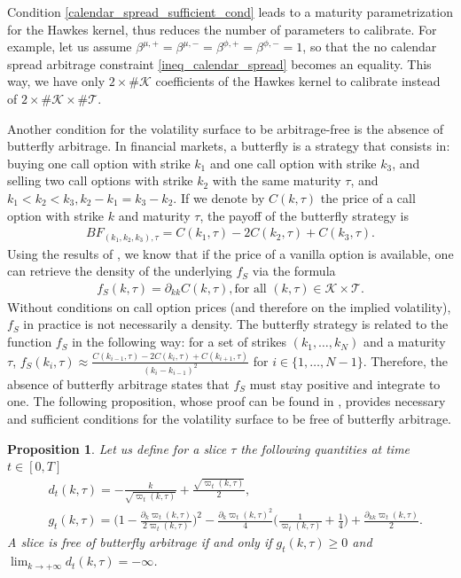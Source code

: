 \documentclass[12pt]{article}
\newtheorem{proposition}[theorem2]{Proposition}
\begin{document}
Condition \eqref{calendar_spread_sufficient_cond} leads to a maturity parametrization for the Hawkes kernel, thus reduces the number of parameters to calibrate. For example, let us assume $\beta^{\mu,+}=\beta^{\mu,-}=\beta^{\phi,+}=\beta^{\phi,-}=1$, so that the no calendar spread arbitrage constraint \eqref{ineq_calendar_spread} becomes an equality. This way, we have only $2\times \#\mathcal{K}$ coefficients of the Hawkes kernel to calibrate instead of $2\times \#\mathcal{K}\times\#\mathcal{T}$. \medskip

Another condition for the volatility surface to be arbitrage-free is the absence of butterfly arbitrage. In financial markets, a butterfly is a strategy that consists in: buying one call option with strike $k_1$ and one call option with strike $k_3$, and selling two call options with strike $k_2$ with the same maturity $\tau$, and $k_1<k_2<k_3, k_2-k_1=k_3-k_2$. If we denote by $C(k, \tau)$ the price of a call option with strike $k$ and maturity $\tau$, the payoff of the butterfly strategy is 
\begin{align*}
    BF_{(k_1,k_2,k_3),\tau} =C(k_1,\tau) - 2 C(k_2,\tau) + C(k_3,\tau). 
\end{align*}
Using the results of \cite{breeden1978prices}, we know that if the price of a vanilla option is available, one can retrieve the density of the underlying $f_S$ via the formula
\begin{align*}
  f_S(k,\tau) = \partial_{kk} C(k,\tau), \text{for all }(k,\tau)\in \mathcal{K}\times\mathcal{T}.
\end{align*}
Without conditions on call option prices (and therefore on the implied volatility), $f_S$ in practice is not necessarily a density. The butterfly strategy is related to the function $f_S$ in the following way: for a set of strikes $(k_1,\dots,k_N)$ and a maturity $\tau$, $f_S(k_i,\tau)\approx \frac{C(k_{i-1},\tau) -2C(k_i,\tau)+C(k_{i+1},\tau)}{(k_i-k_{i-1})^2}$ for $i\in \{1,\dots,N-1\}$. Therefore, the absence of butterfly arbitrage states that $f_S$ must stay positive and integrate to one. The following proposition, whose proof can be found in \cite{gatheral2014arbitrage}, provides necessary and sufficient conditions for the volatility surface to be free of butterfly arbitrage.
\begin{proposition}
Let us define for a slice $\tau$ the following quantities at time $t\in[0,T]$
\begin{align*}
   & d_t(k,\tau) = -\frac{k}{\sqrt{\varpi_t(k,\tau)}}+ \frac{\sqrt{\varpi_t(k,\tau)}}{2} , \\
   & g_t(k,\tau)= \Big(1- \frac{\partial_k\varpi_t(k,\tau)}{2\varpi_t(k,\tau)}\Big)^2 - \frac{\partial_k\varpi_t(k,\tau)^2}{4}\Big(\frac{1}{\varpi_t(k,\tau)}+\frac{1}{4}\Big)+ \frac{\partial_{kk}\varpi_t(k,\tau)}{2}. 
\end{align*}
A slice is free of butterfly arbitrage if and only if $g_t(k,\tau)\geq 0$ and $\lim_{k\to +\infty}d_t(k,\tau)=-\infty$. 
\end{proposition}
\end{document}
